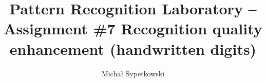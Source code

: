 \documentclass[a4paper]{article}
\begin{document}
\title{Pattern Recognition Laboratory – Assignment \#7
Recognition quality enhancement (handwritten digits)}

\author{Michał Sypetkowski}
\twocolumn
\maketitle
\end{document}
